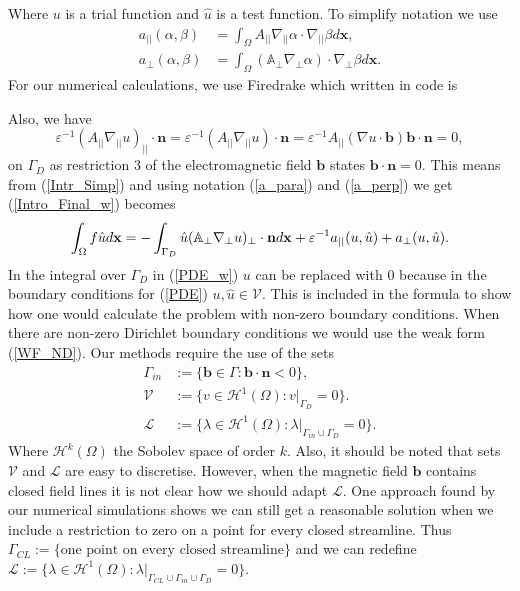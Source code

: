 \documentclass[12pt]{ociamthesis}
\begin{document}
Where $u$ is a trial function and $\hat{u}$ is a test function. To simplify notation we use
\begin{align} \label{a_para}
a_{||}(\alpha, \beta) &= \int_{\Omega} A_{||} \nabla_{||}\alpha \cdot \nabla_{||}\beta d\mathbf{x}, \\ \label{a_perp}
a_{\perp}(\alpha, \beta) &= \int_{\Omega}(\mathbb{A}_{\perp} \nabla_{\perp}\alpha )\cdot \nabla_{\perp} \beta d\mathbf{x}.
\end{align}
For our numerical calculations, we use Firedrake \cite{Dragon} which written in code is 

Also, we have 
\begin{equation} \label{Intr_Simp}
\varepsilon^{-1} (A_{||}\nabla_{||}u)_{||}\cdot \mathbf{n} = \varepsilon^{-1} (A_{||}\nabla_{||}u)\cdot \mathbf{n} = \varepsilon^{-1} A_{||}(\nabla u \cdot \mathbf{b}) \mathbf{b} \cdot \mathbf{n} = 0,
\end{equation}
on $\Gamma_D$ as restriction $3$ of the electromagnetic field $\mathbf{b}$ states $\mathbf{b}\cdot \mathbf{n}=0$. This means from (\ref{Intr_Simp}) and using notation (\ref{a_para}) and (\ref{a_perp}) we get (\ref{Intro_Final_w}) becomes
\begin{equation} \label{PDE_w}
\int_{\Omega}f\hat{u}d\mathbf{x} = -\int_{\Gamma_D}\hat{u}(\mathbb{A}_{\perp}\nabla_{\perp} u)_{\perp}\cdot \mathbf{n} d \mathbf{x} + 
\varepsilon^{-1} a_{||}(u,\hat{u})+a_{\perp}(u, \hat{u}).\\
\end{equation}
In the integral over $\Gamma_D$ in (\ref{PDE_w}) $u$ can be replaced with $0$ because in the boundary conditions for (\ref{PDE}) $u,\hat{u} \in \mathcal{V}$. This is included in the formula to show how one would calculate the problem with non-zero boundary conditions. When there are non-zero Dirichlet boundary conditions we would use the weak form (\ref{WF_ND}).
Our methods require the use of the sets 
\begin{align}
\Gamma_{in} &:= \{\mathbf{b} \in \Gamma : \mathbf{b} \cdot \mathbf{n} < 0\}, \\
\mathcal{V} &:= \{v \in \mathcal{H}^1(\Omega) : v|_{\Gamma_{D}} = 0\}. \\
\mathcal{L} &:= \{\lambda \in \mathcal{H}^1(\Omega) : \lambda |_{\Gamma_{in}\cup \Gamma_{D}} = 0\}.
\end{align}
Where $\mathcal{H}^k(\Omega)$ the Sobolev space of order $k$. Also, it should be noted that sets $\mathcal{V}$ and $\mathcal{L}$ are easy to discretise. However, when the magnetic field $\mathbf{b}$ contains closed field lines it is not clear how we should adapt $\mathcal{L}$. One approach found by our numerical simulations shows we can still get a reasonable solution when we include a restriction to zero on a point for every closed streamline. Thus $\Gamma_{CL} := \{\text{one point on every closed streamline}\}$ and we can redefine $\mathcal{L} := \{\lambda \in \mathcal{H}^1(\Omega) : \lambda |_{\Gamma_{CL}\cup \Gamma_{in}\cup \Gamma_{D}} = 0\}$.
\end{document}
